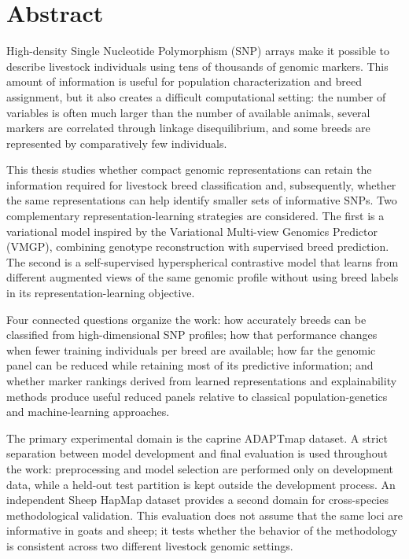 \chapter*{Abstract}

High-density Single Nucleotide Polymorphism (SNP) arrays make it
possible to describe livestock individuals using tens of thousands of
genomic markers. This amount of information is useful for population
characterization and breed assignment, but it also creates a difficult
computational setting: the number of variables is often much larger
than the number of available animals, several markers are correlated
through linkage disequilibrium, and some breeds are represented by
comparatively few individuals.

This thesis studies whether compact genomic representations can retain
the information required for livestock breed classification and,
subsequently, whether the same representations can help identify
smaller sets of informative SNPs. Two complementary
representation-learning strategies are considered. The first is a
variational model inspired by the Variational Multi-view Genomics
Predictor (VMGP), combining genotype reconstruction with supervised
breed prediction. The second is a self-supervised hyperspherical
contrastive model that learns from different augmented views of the
same genomic profile without using breed labels in its
representation-learning objective.

Four connected questions organize the work: how accurately breeds can
be classified from high-dimensional SNP profiles; how that
performance changes when fewer training individuals per breed are
available; how far the genomic panel can be reduced while retaining
most of its predictive information; and whether marker rankings
derived from learned representations and explainability methods
produce useful reduced panels relative to classical population-genetics
and machine-learning approaches.

The primary experimental domain is the caprine ADAPTmap dataset. A
strict separation between model development and final evaluation is
used throughout the work: preprocessing and model selection are
performed only on development data, while a held-out test partition is
kept outside the development process. An independent Sheep HapMap
dataset provides a second domain for cross-species methodological
validation. This evaluation does not assume that the same loci are
informative in goats and sheep; it tests whether the behavior of the
methodology is consistent across two different livestock genomic
settings.

